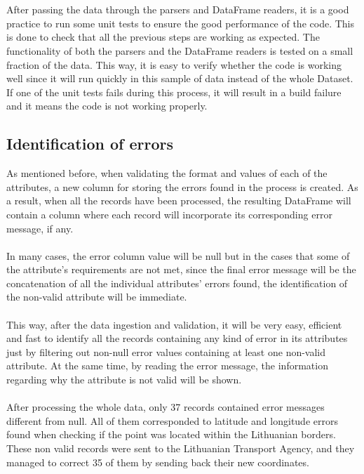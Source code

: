 \\
\\
After passing the data through the parsers and DataFrame readers, it is a good practice to run some unit tests to ensure the good performance of the code. This is done to check that all the previous steps are working as expected. The functionality of both the parsers and the DataFrame readers is tested on a small fraction of the data. This way, it is easy to verify whether the code is working well since it will run quickly in this sample of data instead of the whole Dataset. If one of the unit tests fails during this process, it will result in a build failure and it means the code is not working properly. 
    
    
\subsection{Identification of errors} \label{sec:errors}
As mentioned before, when validating the format and values of each of the attributes, a new column for storing the errors found in the process is created. As a result, when all the records have been processed, the resulting DataFrame will contain a column where each record will incorporate its corresponding error message, if any. 
\\
\\
In many cases, the error column value will be null but in the cases that some of the attribute's requirements are not met, since the final error message will be the concatenation of all the individual attributes' errors found, the identification of the non-valid attribute will be immediate.
\\
\\
This way, after the data ingestion and validation, it will be very easy, efficient and fast to identify all the records containing any kind of error in its attributes just by filtering out non-null error values containing at least one non-valid attribute. At the same time, by reading the error message, the information regarding why the attribute is not valid will be shown.
\\
\\
After processing the whole data, only 37 records contained error messages different from null. All of them corresponded to latitude and longitude errors found when checking if the point was located within the Lithuanian borders.
These non valid records were sent to the Lithuanian Transport Agency, and they managed to correct 35 of them by sending back their new coordinates.

